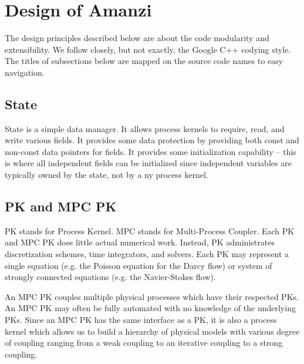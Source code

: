 %
%

\section{Design of Amanzi}

The design principles described below are about the code modularity and extensibility.
We follow closely, but not exactly, the Google C++ codying style.
The titles of subsections below are mapped on the source code names
to easy navigation.


\subsection{State}

State is a simple data manager. 
It allows process kernels to require, read, and write various fields.
It provides some data protection by providing both const and non-const data pointers for fields.
It provides some initialization capability -- this is where all independent fields can be 
initialized since independent variables are typically owned by the state, not by a ny process kernel.



\subsection{PK and MPC PK}

PK stands for Process Kernel.
MPC stands for Multi-Process Coupler.
Each PK and MPC PK does little actual numerical work.
Instead, PK administrates discretization schemes, time integrators, and solvers. 
Each PK may represent a single equation (e.g. the Poisson equation for the Darcy flow) 
or system of strongly connected equations (e.g. the Navier-Stokes flow).

An MPC PK couples multiple physical processes which have their respected PKs.
An MPC PK may often be fully automated with no knowledge of the underlying PKs.
Since an MPC PK has the same interface as a PK, it is also a process kernel which
allows us to build a hierarchy of physical models with various degree of coupling
ranging from a weak coupling to an iterative coupling to a strong coupling.

